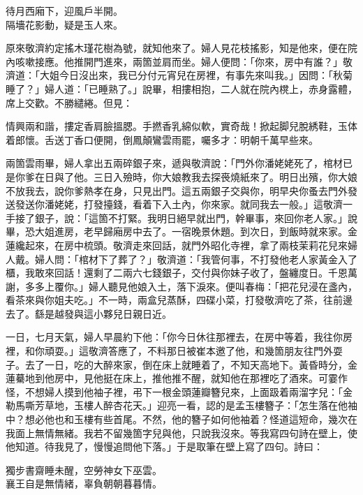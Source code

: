 \begin{myquote}
待月西廂下，迎風戶半開。\\隔墻花影動，疑是玉人來。
\end{myquote}

原來敬濟約定搖木瑾花樹為號，就知他來了。婦人見花枝搖影，知是他來，便在院內咳嗽接應。他推開門進來，兩箇並肩而坐。婦人便問：「你來，房中有誰？」敬濟道：「大姐今日沒出來，我已分付元宵兒在房裡，有事先來叫我。」因問：「秋菊睡了？」婦人道：「已睡熟了。」說畢，相摟相抱，二人就在院內櫈上，赤身露體，席上交歡。不勝繾綣。但見：

\begin{myquote}
情興兩和諧，摟定香肩臉搵腮。手撚香乳綿似軟，實奇哉！掀起脚兒脫綉鞋，玉体着郎懷。舌送丁香口便開，倒鳳顛鸞雲雨罷，囑多才：明朝千萬早些來。
\end{myquote}

兩箇雲雨畢，婦人拿出五兩碎銀子來，遞與敬濟說：「門外你潘姥姥死了，棺材已是你爹在日與了他。三日入殮時，你大娘教我去探䘮燒紙來了。明日出殯，你大娘不放我去，說你爹熱孝在身，只見出門。這五兩銀子交與你，明早央你蚤去門外發送發送你潘姥姥，打發擡錢，看着下入土內，你來家。就同我去一般。」{}這敬濟一手接了銀子，說：「這箇不打緊。我明日絕早就出門，幹畢事，來回你老人家。」說畢，恐大姐進房，老早歸廂房中去了。一宿晚景休題。到次日，到飯時就來家。金蓮纔起來，在房中梳頭。敬濟走來回話，就門外昭化寺裡，拿了兩枝茉莉花兒來婦人戴。婦人問：「棺材下了葬了？」敬濟道：「我管何事，不打發他老人家黃金入了櫃，我敢來回話！還剩了二兩六七錢銀子，交付與你妹子收了，盤纏度日。千恩萬謝，多多上覆你。」婦人聽見他娘入土，落下淚來。{}便叫春梅：「把花兒浸在盞內，看茶來與你姐夫吃。」不一時，兩盒兒蒸酥，四碟小菜，打發敬濟吃了茶，往前邊去了。繇是越發與這小夥兒日親日近。

一日，七月天氣，婦人早晨約下他：「你今日休往那裡去，在房中等着，我往你房裡，和你頑耍。」這敬濟答應了，不料那日被崔本邀了他，和幾箇朋友往門外耍子。去了一日，吃的大醉來家，倒在床上就睡着了，不知天高地下。黃昏時分，金蓮驀地到他房中，見他挺在床上，推他推不醒，就知他在那裡吃了酒來。可霎作怪，不想婦人摸到他袖子裡，弔下一根金頭蓮瓣簪兒來，上面趿着兩溜字兒：「金勒馬嘶芳草地，玉樓人醉杏花天。」{}迎亮一看，認的是孟玉樓簪子：「怎生落在他袖中？想必他也和玉樓有些首尾。不然，他的簪子如何他袖着？怪道這短命，幾次在我面上無情無緒。我若不留幾箇字兒與他，只說我沒來。等我寫四句詩在壁上，使他知道。待我見了，慢慢追問他下落。」于是取筆在壁上寫了四句。詩曰：

\begin{myquote}
獨步書齋睡未醒，空勞神女下巫雲。\\襄王自是無情緒，辜負朝朝暮暮情。
\end{myquote}

